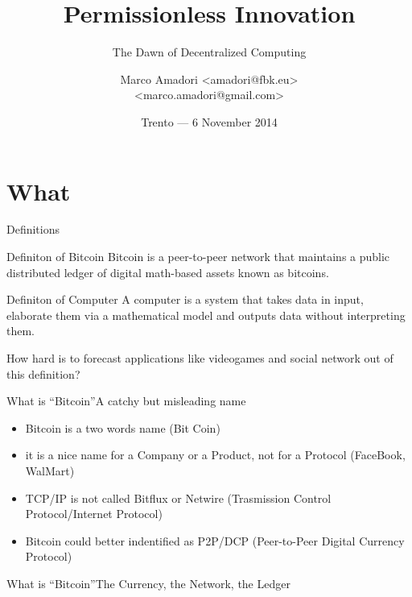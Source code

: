 \documentclass[english,compress]{beamer}
\title[Bitcoin Overview]{Permissionless Innovation}
\subtitle{The Dawn of Decentralized Computing}
\author[Marco Amadori]{Marco Amadori <amadori@fbk.eu> \\ <marco.amadori@gmail.com>}
\institute{Fondazione Bruno Kessler --- \url{https://www.fbk.eu}}
\date{\scriptsize Trento --- \vspace{.10cm}6 November 2014}
\begin{document}
\begin{frame}[plain]
  \titlepage
  \begin{center}%
    \hspace{1cm}%
    \end{center}%
\end{frame}


\section{What}

\begin{frame}[<+->]{Definitions}

\begin{exampleblock}{Definiton of Bitcoin}
Bitcoin is a peer-to-peer network
that maintains a public distributed ledger of 
digital math-based assets known as bitcoins.
\end{exampleblock}

\begin{exampleblock}{Definiton of Computer}
A computer is a system that takes data in input, elaborate them via a mathematical model and outputs data without interpreting them.
\end{exampleblock}

\onslide<+-> How hard is to forecast applications like videogames and social network out of this definition?


\end{frame}

\begin{frame}{What is ``Bitcoin''}{A catchy but misleading name}
\begin{itemize}
 \item Bitcoin is a two words name (Bit Coin)
 \item it is a nice name for a Company or a Product, not for a Protocol (FaceBook, WalMart)
 \item TCP/IP is not called Bitflux or Netwire (Trasmission Control Protocol/Internet Protocol)
 \item Bitcoin could better indentified as P2P/DCP (Peer-to-Peer Digital Currency Protocol)
\end{itemize}


\end{frame}

\begin{frame}{What is ``Bitcoin''}{The Currency, the Network, the Ledger}
\begin{center}
\end{center}
\end{frame}
\end{document}
